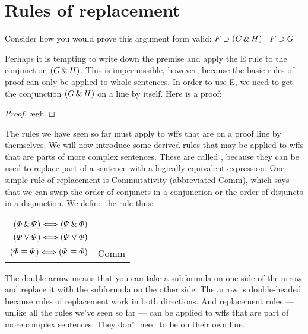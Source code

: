 \section{Rules of replacement}

Consider how you would prove this argument form valid: $F\supset(G\,\&\, H)$ \therefore\ $F\supset G$

Perhaps it is tempting to write down the premise and apply the {\eand}E rule to the conjunction $(G \,\&\, H)$. This is impermissible, however, because the basic rules of proof can only be applied to whole sentences. In order to use {\eand}E, we need to get the conjunction $(G \,\&\, H)$ on a line by itself. Here is a proof:

\begin{proof}
	\open
		\ae{gh}
	\close
\end{proof}

The rules we have seen so far must apply to wffs that are on a proof line by themselves. We will now introduce some derived rules that may be applied to wffs that are parts of more complex sentences. These are called , because they can be used to replace part of a sentence with a logically equivalent expression. One simple rule of replacement is Commutativity (abbreviated Comm), which says that we can swap the order of conjuncts in a conjunction or the order of disjuncts in a disjunction. We define the rule thus:

\begin{center}
\begin{tabular}{rl}
$(\varPhi{}\,\&\,\varPsi{}) \Longleftrightarrow (\varPsi{}\,\&\,\varPhi{})$\\
$(\varPhi{}\vee\varPsi{}) \Longleftrightarrow (\varPsi{}\vee\varPhi{})$\\
$(\varPhi{}\equiv\varPsi{}) \Longleftrightarrow (\varPsi{}\equiv\varPhi{})$
& Comm
\end{tabular}
\end{center}

The double arrow means that you can take a subformula on one side of the arrow and replace it with the subformula on the other side. The arrow is double-headed because rules of replacement work in both directions. And replacement rules --- unlike all the rules we've seen so far --- can be applied to wffs that are part of more complex sentences. They don't need to be on their own line.

